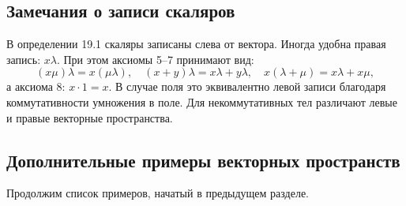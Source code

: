 \documentclass[a4paper,12pt]{article}
\theoremstyle{definition}
\theoremstyle{plain}
\theoremstyle{remark}
\begin{document}
	\subsection{Замечания о записи скаляров}
	
	В определении 19.1 скаляры записаны слева от вектора. Иногда удобна правая запись: \( x \lambda \). При этом аксиомы 5–7 принимают вид:
	\[
	(x \mu) \lambda = x (\mu \lambda), \quad (x + y) \lambda = x \lambda + y \lambda, \quad x (\lambda + \mu) = x \lambda + x \mu,
	\]
	а аксиома 8: \( x \cdot 1 = x \). В случае поля это эквивалентно левой записи благодаря коммутативности умножения в поле. Для некоммутативных тел различают левые и правые векторные пространства.
	
	
	\subsection{Дополнительные примеры векторных пространств}
	
	Продолжим список примеров, начатый в предыдущем разделе.
	
\end{document}
